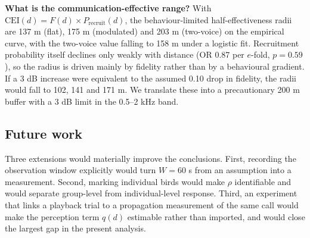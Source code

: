 \textbf{What is the communication-effective range?} With
$\mathrm{CEI}(d)=F(d)\times P_{\mathrm{recruit}}(d)$, the behaviour-limited half-effectiveness
radii are 137 m (flat), 175 m (modulated) and 203 m (two-voice) on the empirical curve, with the
two-voice value falling to 158 m under a logistic fit. Recruitment probability itself declines
only weakly with distance (OR 0.87 per $e$-fold, $p=0.59$), so the radius is driven mainly by
fidelity rather than by a behavioural gradient. If a 3 dB increase were equivalent to the assumed
0.10 drop in fidelity, the radii would fall to 102, 141 and 171 m. We translate these into a
precautionary 200 m buffer with a 3 dB limit in the 0.5--2 kHz band.

\subsection{Future work}

Three extensions would materially improve the conclusions. First, recording the observation
window explicitly would turn $W=60$ s from an assumption into a measurement. Second, marking
individual birds would make $\rho$ identifiable and would separate group-level from
individual-level response. Third, an experiment that links a playback trial to a propagation
measurement of the same call would make the perception term $q(d)$ estimable rather than
imported, and would close the largest gap in the present analysis.
